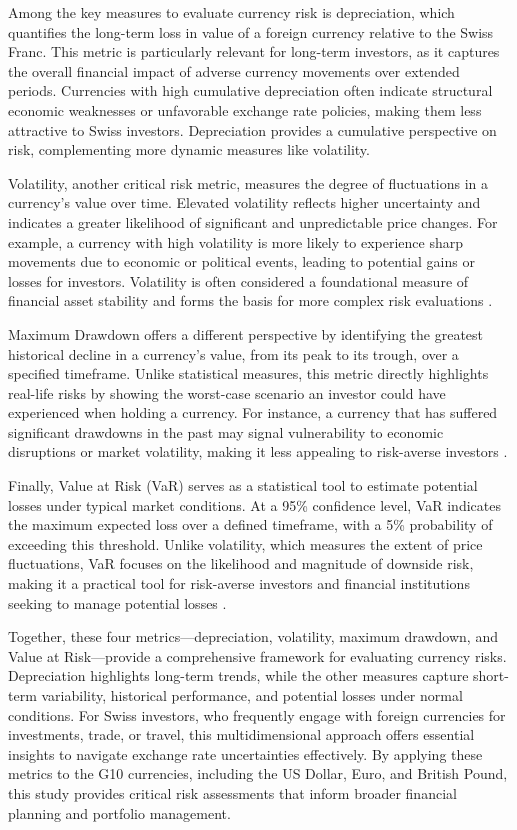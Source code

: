 \documentclass[11pt,a4paper,english,oneside]{book}
\begin{document}
Among the key measures to evaluate currency risk is depreciation, which quantifies the long-term loss in value of a foreign currency relative to the Swiss Franc. This metric is particularly relevant for long-term investors, as it captures the overall financial impact of adverse currency movements over extended periods. Currencies with high cumulative depreciation often indicate structural economic weaknesses or unfavorable exchange rate policies, making them less attractive to Swiss investors. Depreciation provides a cumulative perspective on risk, complementing more dynamic measures like volatility.

Volatility, another critical risk metric, measures the degree of fluctuations in a currency’s value over time. Elevated volatility reflects higher uncertainty and indicates a greater likelihood of significant and unpredictable price changes. For example, a currency with high volatility is more likely to experience sharp movements due to economic or political events, leading to potential gains or losses for investors. Volatility is often considered a foundational measure of financial asset stability and forms the basis for more complex risk evaluations \parencite{poon2003forecasting}.

Maximum Drawdown offers a different perspective by identifying the greatest historical decline in a currency's value, from its peak to its trough, over a specified timeframe. Unlike statistical measures, this metric directly highlights real-life risks by showing the worst-case scenario an investor could have experienced when holding a currency. For instance, a currency that has suffered significant drawdowns in the past may signal vulnerability to economic disruptions or market volatility, making it less appealing to risk-averse investors \parencite{geboers2023peak}.

Finally, Value at Risk (VaR) serves as a statistical tool to estimate potential losses under typical market conditions. At a 95\% confidence level, VaR indicates the maximum expected loss over a defined timeframe, with a 5\% probability of exceeding this threshold. Unlike volatility, which measures the extent of price fluctuations, VaR focuses on the likelihood and magnitude of downside risk, making it a practical tool for risk-averse investors and financial institutions seeking to manage potential losses \parencite{poon2003forecasting}.

Together, these four metrics—depreciation, volatility, maximum drawdown, and Value at Risk—provide a comprehensive framework for evaluating currency risks. Depreciation highlights long-term trends, while the other measures capture short-term variability, historical performance, and potential losses under normal conditions. For Swiss investors, who frequently engage with foreign currencies for investments, trade, or travel, this multidimensional approach offers essential insights to navigate exchange rate uncertainties effectively. By applying these metrics to the G10 currencies, including the US Dollar, Euro, and British Pound, this study provides critical risk assessments that inform broader financial planning and portfolio management.
\end{document}
